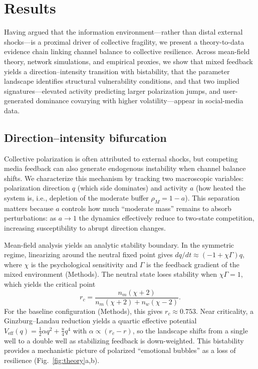\documentclass[11pt]{article}
\begin{document}
\section{Results}
\noindent Having argued that the information environment---rather than distal external shocks---is a proximal driver of collective fragility, we present a theory-to-data evidence chain linking channel balance to collective resilience. Across mean-field theory, network simulations, and empirical proxies, we show that mixed feedback yields a direction--intensity transition with bistability, that the parameter landscape identifies structural vulnerability conditions, and that two implied signatures---elevated activity predicting larger polarization jumps, and user-generated dominance covarying with higher volatility---appear in social-media data.

\subsection{Direction--intensity bifurcation}
\label{sec:direction-intensity-bifurcation}
Collective polarization is often attributed to external shocks, but competing media feedback can also generate endogenous instability when channel balance shifts. We characterize this mechanism by tracking two macroscopic variables: polarization direction $q$ (which side dominates) and activity $a$ (how heated the system is, i.e., depletion of the moderate buffer $\rho_M=1-a$). This separation matters because $a$ controls how much ``moderate mass'' remains to absorb perturbations: as $a\to 1$ the dynamics effectively reduce to two-state competition, increasing susceptibility to abrupt direction changes.

Mean-field analysis yields an analytic stability boundary. In the symmetric regime, linearizing around the neutral fixed point gives $dq/dt\approx(-1+\chi\Gamma)q$, where $\chi$ is the psychological sensitivity and $\Gamma$ is the feedback gradient of the mixed environment (Methods). The neutral state loses stability when $\chi\Gamma=1$, which yields the critical point
\begin{equation}
r_c=\frac{n_m(\chi+2)}{n_m(\chi+2)+n_w(\chi-2)}.
\label{eq:rc}
\end{equation}
For the baseline configuration (Methods), this gives $r_c\approx 0.753$. Near criticality, a Ginzburg--Landau reduction yields a quartic effective potential $V_{\text{eff}}(q)=\tfrac{1}{2}\alpha q^2+\tfrac{u}{4}q^4$ with $\alpha\propto(r_c-r)$, so the landscape shifts from a single well to a double well as stabilizing feedback is down-weighted. This bistability provides a mechanistic picture of polarized ``emotional bubbles'' as a loss of resilience (Fig.~\ref{fig:theory}a,b).
\end{document}
